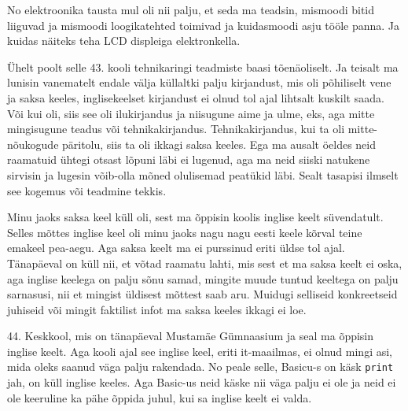 No elektroonika tausta mul oli nii palju, et seda ma teadsin, mismoodi bitid liiguvad ja mismoodi  loogikatehted toimivad ja kuidasmoodi asju tööle panna. Ja kuidas näiteks teha LCD displeiga elektronkella.  


Ühelt poolt selle 43. kooli tehnikaringi teadmiste baasi tõenäoliselt. Ja teisalt ma lunisin vanematelt endale välja küllaltki palju kirjandust, mis oli põhiliselt vene ja saksa keeles, inglisekeelset kirjandust ei olnud tol ajal lihtsalt kuskilt saada. Või kui oli, siis see oli ilukirjandus ja niisugune aime ja ulme, eks, aga mitte mingisugune teadus või tehnikakirjandus. Tehnikakirjandus, kui ta oli mitte-nõukogude päritolu, siis ta oli ikkagi saksa keeles. Ega ma ausalt öeldes neid raamatuid ühtegi otsast lõpuni läbi ei lugenud, aga ma neid siiski natukene sirvisin ja  lugesin võib-olla mõned olulisemad peatükid läbi. Sealt tasapisi ilmselt see kogemus või  teadmine tekkis.


Minu jaoks saksa keel küll oli, sest ma õppisin koolis inglise keelt süvendatult. Selles mõttes inglise keel oli  minu jaoks nagu nagu eesti keele kõrval teine emakeel pea-aegu. Aga saksa keelt ma ei purssinud eriti üldse tol ajal. Tänapäeval on küll nii, et võtad raamatu lahti, mis sest et ma saksa keelt ei oska, aga  inglise keelega on palju sõnu samad, mingite muude tuntud keeltega on palju sarnasusi, nii et mingist üldisest mõttest saab aru. Muidugi selliseid konkreetseid juhiseid või mingit faktilist infot ma saksa keeles ikkagi ei loe. 


44. Keskkool, mis on tänapäeval Mustamäe Gümnaasium ja seal ma õppisin inglise keelt. Aga kooli ajal see inglise keel, eriti it-maailmas, ei olnud mingi asi, mida oleks saanud väga palju rakendada. No peale selle, Basicu-s on käsk \verb|print| jah, on küll inglise keeles. Aga Basic-us neid käske nii väga palju ei ole ja neid ei ole keeruline ka pähe õppida juhul, kui sa inglise keelt ei valda. 



